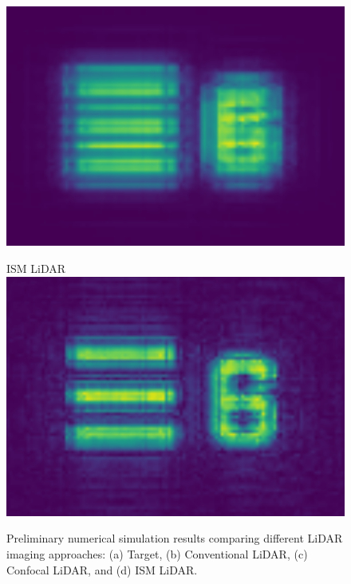 \documentclass{article}
\begin{document}
\begin{figure}[hbt!]
\begin{minipage}{.225\linewidth}
\includegraphics[width=\linewidth]{003 Confocal Imaging.png}
\label{subfig:confocal}
\end{minipage}\hfill
\begin{minipage}{.225\linewidth}
\centering
\captionsetup{type=figure}
ISM LiDAR \
\includegraphics[width=\linewidth]{004 ISM Imaging.png}
\label{subfig:ISM}
\end{minipage}
\caption{Preliminary numerical simulation results comparing different LiDAR imaging approaches: (a) Target, (b) Conventional LiDAR, (c) Confocal LiDAR, and (d) ISM LiDAR.}
\label{fig:comparison}
\end{figure}

\small
\printbibliography
\end{document}
